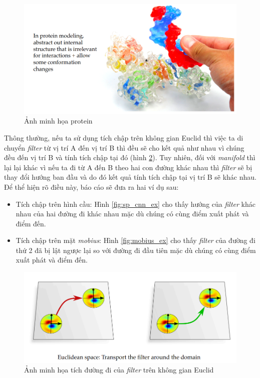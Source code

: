 \begin{figure}[H]
    \centering
    \includegraphics[width=1\linewidth]{Images/GDL/manifold_mesh/protein.png}
    \caption{Ảnh minh họa protein\cite{geometricdeep2022}}
    \label{fig:protein}
\end{figure}

Thông thường, nếu ta sử dụng tích chập trên không gian Euclid thì việc ta di chuyển \textit{filter} từ vị trí A đến vị trí B thì đều sẽ cho kết quả như nhau vì chúng đều đến vị trí B và tính tích chập tại đó (hình \ref{fig:ecnn}). Tuy nhiên, đối với \textit{manifold} thì lại lại khác vì nếu ta đi từ A đến B theo hai con đường khác nhau thì \textit{filter} sẽ bị thay đổi hướng ban đầu và do đó kết quả tính tích chập tại vị trí B sẽ khác nhau. Để thể hiện rõ điều này, báo cáo sẽ đưa ra hai ví dụ sau:
\begin{itemize}
    \item Tích chập trên hình cầu: Hình \ref{fig:sp_cnn_ex} cho thấy hướng của \textit{filter} khác nhau của hai đường đi khác nhau mặc dù chúng có cùng điểm xuất phát và điểm đến.

    \item Tích chập trên mặt \textit{mobius}: Hình \ref{fig:mobius_ex} cho thấy \textit{filter} của đường đi thứ 2 đã bị lật ngược lại so với đường đi đầu tiên mặc dù chúng có cùng điểm xuất phát và điểm đến.
\end{itemize}

\begin{figure}[H]
    \centering
    \includegraphics[width=1\linewidth]{Images/GDL/manifold_mesh/E_CNN.png}
    \caption{Ảnh minh họa tích đường đi của \textit{filter} trên không gian Euclid\cite{geometricdeep2022}}
    \label{fig:ecnn}
\end{figure}

